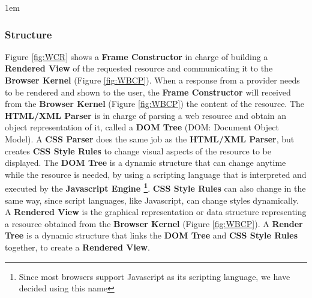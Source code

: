 \documentclass[]{acmlarge}
\begin{document}

    \leftskip1em

    \subsubsection*{Structure}
    Figure \ref{fig:WCR} shows a \textbf{Frame Constructor} in charge of building a \textbf{Rendered View} of the requested resource and communicating it to the \textbf{Browser Kernel} (Figure \ref{fig:WBCP}). When a response from a provider needs to be rendered and shown to the user, the \textbf{Frame Constructor} will received from the \textbf{Browser Kernel} (Figure \ref{fig:WBCP}) the content of the resource. The \textbf{HTML/XML Parser} is in charge of parsing a web resource and obtain an object representation of it, called a \textbf{DOM Tree} (DOM: Document Object Model). A \textbf{CSS Parser} does the same job as the \textbf{HTML/XML Parser}, but creates \textbf{CSS Style Rules} to change visual aspects of the resource to be displayed. The \textbf{DOM Tree} is a dynamic structure that can change anytime while the resource is needed, by using a scripting language that is interpreted and executed by the \textbf{Javascript Engine \footnote{Since most browsers support Javascript as its scripting language, we have decided using this name}}. \textbf{CSS Style Rules} can also change in the same way, since script languages, like Javascript, can change styles dynamically. A \textbf{Rendered View} is the graphical representation or data structure representing a resource obtained from the \textbf{Browser Kernel} (Figure \ref{fig:WBCP}). A \textbf{Render Tree} is a dynamic structure that links the \textbf{DOM Tree} and \textbf{CSS Style Rules} together, to create a \textbf{Rendered View}.
\end{document}
